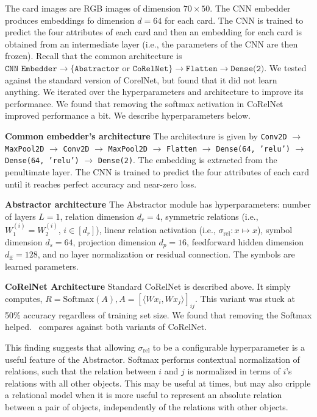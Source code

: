 The card images are RGB images of dimension $70 \times 50$. The CNN embedder produces embeddings fo dimension $d=64$ for each card. The CNN is trained to predict the four attributes of each card and then an embedding for each card is obtained from an intermediate layer (i.e., the parameters of the CNN are then frozen). Recall that the common architecture is $\texttt{CNN Embedder} \to \{\texttt{Abstractor} \text{ or } \texttt{CoRelNet}\} \to \texttt{Flatten} \to \texttt{Dense(2)}$. We tested against the standard version of CorelNet, but found that it did not learn anything. We iterated over the hyperparameters and architecture to improve its performance. We found that removing the softmax activation in CoRelNet improved performance a bit. We describe hyperparameters below.

\textbf{Common embedder's architecture} The architecture is given by \texttt{Conv2D} $\to$ \texttt{MaxPool2D} $\to$ \texttt{Conv2D} $\to$ \texttt{MaxPool2D} $\to$ \texttt{Flatten} $\to$ \texttt{Dense(64, 'relu')} $\to$ \texttt{Dense(64, 'relu')} $\to$ \texttt{Dense(2)}. The embedding is extracted from the penultimate layer. The CNN is trained to predict the four attributes of each card until it reaches perfect accuracy and near-zero loss.

\textbf{Abstractor architecture}
The Abstractor module has hyperparameters: number of layers $L = 1$, relation dimension $d_r = 4$, symmetric relations (i.e., $W_1^{(i)} = W_2^{(i)}$, $i \in [d_r]$), linear relation activation (i.e., $\sigma_{\mathrm{rel}}: x \mapsto x$), symbol dimension $d_s = 64$, projection dimension $d_p = 16$, feedforward hidden dimension $d_{\mathrm{ff}} = 128$, and no layer normalization or residual connection. The symbols are learned parameters.

\textbf{CoRelNet Architecture} Standard CoRelNet is described above. It simply computes, $R = \text{Softmax}(A), A = {\left[\langle W x_i, W x_j\rangle\right]}_{ij}$. This variant was stuck at 50\% accuracy regardless of training set size. We found that removing the Softmax helped.~ compares against both variants of CoRelNet.

This finding suggests that allowing $\sigma_{\mathrm{rel}}$ to be a configurable hyperparameter is a useful feature of the Abstractor. Softmax performs contextual normalization of relations, such that the relation between $i$ and $j$ is normalized in terms of $i$'s relations with all other objects. This may be useful at times, but may also cripple a relational model when it is more useful to represent an absolute relation between a pair of objects, independently of the relations with other objects.

